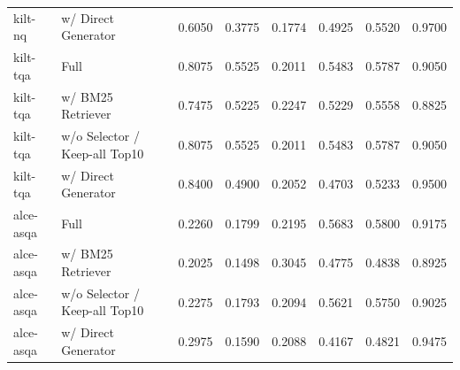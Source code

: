 \begin{table}[t]
\begin{tabular}{llrrrrrr}
kilt-nq & w/ Direct Generator & 0.6050 & 0.3775 & 0.1774 & 0.4925 & 0.5520 & 0.9700 \\
kilt-tqa & Full & 0.8075 & 0.5525 & 0.2011 & 0.5483 & 0.5787 & 0.9050 \\
kilt-tqa & w/ BM25 Retriever & 0.7475 & 0.5225 & 0.2247 & 0.5229 & 0.5558 & 0.8825 \\
kilt-tqa & w/o Selector / Keep-all Top10 & 0.8075 & 0.5525 & 0.2011 & 0.5483 & 0.5787 & 0.9050 \\
kilt-tqa & w/ Direct Generator & 0.8400 & 0.4900 & 0.2052 & 0.4703 & 0.5233 & 0.9500 \\
alce-asqa & Full & 0.2260 & 0.1799 & 0.2195 & 0.5683 & 0.5800 & 0.9175 \\
alce-asqa & w/ BM25 Retriever & 0.2025 & 0.1498 & 0.3045 & 0.4775 & 0.4838 & 0.8925 \\
alce-asqa & w/o Selector / Keep-all Top10 & 0.2275 & 0.1793 & 0.2094 & 0.5621 & 0.5750 & 0.9025 \\
alce-asqa & w/ Direct Generator & 0.2975 & 0.1590 & 0.2088 & 0.4167 & 0.4821 & 0.9475 \\
\end{tabular}
\medskip
\end{table}
